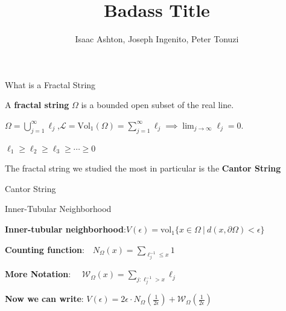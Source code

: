 \documentclass{if-beamer}
\title[]{Badass Title}
\subtitle{}
\author{Isaac Ashton, Joseph Ingenito, Peter Tonuzi}
\institute[]{The College of New Jersey}
\date{}
\newcommand{\SL}{\mathcal{L}}
\newcommand{\Om}{\Omega}
\newcommand{\W}{\mathcal{W}}
\begin{document}
\begin{frame}
  \titlepage
\end{frame}



\begin{frame}{What is a Fractal String}

\begin{definition}
A {\bf fractal string} $\Om$ is a bounded open subset of the real line.
\end{definition}

\pause
\vspace{.2 in}

$\Omega = \displaystyle\bigcup_{j = 1}^\infty \ell_j$,\qquad $\displaystyle \SL = \text{Vol}_1\left(\Omega\right) = \sum_{j = 1}^\infty \ell_j \implies \lim_{j \to \infty} \ell_j = 0$.

\pause
\vspace{.2 in}

$\ell_1 \geq \ell_2 \geq \ell_3 \geq \cdots \geq 0$

\pause
\vspace{.2 in}

The fractal string we studied the most in particular is the {\bf Cantor String}

\end{frame}



\begin{frame}{Cantor String}
	\begin{center}
	\end{center}
\end{frame}



\begin{frame}{Inner-Tubular Neighborhood}

\begin{definition}
{\bf Inner-tubular neighborhood}:\quad $V(\epsilon) = \text{vol}_1\{x \in \Omega\ |\ d(x,\partial\Omega) < \epsilon\}$
\end{definition}

\pause
\vspace{.2 in}

{\bf Counting function}:$\displaystyle \quad N_{\Omega}(x) = \sum_{\ell_j^{-1} \leq x}1$

\vspace{.2 in}

{\bf More Notation}: $\displaystyle \quad \W_\Om(x) = \sum_{j:\ell_j^{-1} > x}{\ell_j}$

\vspace{.2 in}

{\bf Now we can write}: $V(\epsilon) = 2\epsilon \cdot N_\Om\left(\frac{1}{2\epsilon}\right) + \W_\Om\left(\frac{1}{2\epsilon}\right)$

\end{frame}
\end{document}
